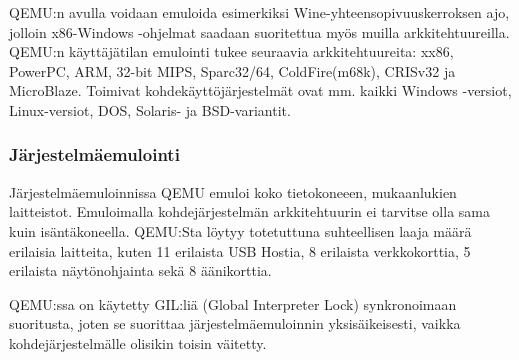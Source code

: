 QEMU:n avulla voidaan emuloida esimerkiksi Wine-yhteensopivuuskerroksen ajo, jolloin x86-Windows -ohjelmat saadaan suoritettua myös muilla arkkitehtuureilla. QEMU:n käyttäjätilan emulointi tukee seuraavia arkkitehtuureita: xx86, PowerPC, ARM, 32-bit MIPS, Sparc32/64, ColdFire(m68k), CRISv32 ja MicroBlaze. Toimivat kohdekäyttöjärjestelmät ovat mm. kaikki Windows -versiot, Linux-versiot, DOS, Solaris- ja BSD-variantit.


\subsubsection{Järjestelmäemulointi}
Järjestelmäemuloinnissa QEMU emuloi koko tietokoneeen, mukaanlukien laitteistot. Emuloimalla kohdejärjestelmän arkkitehtuurin ei tarvitse olla sama kuin isäntäkoneella. QEMU:Sta löytyy totetuttuna suhteellisen laaja määrä erilaisia laitteita, kuten 11 erilaista USB Hostia, 8 erilaista verkkokorttia, 5 erilaista näytönohjainta sekä 8 äänikorttia.\cite{qemu_doc}

QEMU:ssa on käytetty GIL:liä (Global Interpreter Lock) synkronoimaan suoritusta, joten se suorittaa järjestelmäemuloinnin yksisäikeisesti, vaikka kohdejärjestelmälle olisikin toisin väitetty. \cite{qemu_tech}







